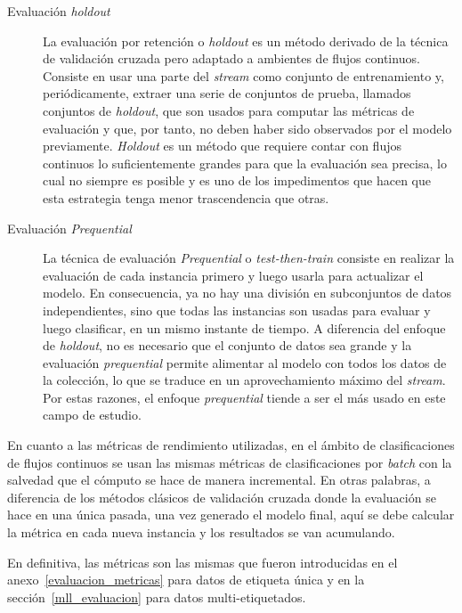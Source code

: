\begin{description}

	\item[Evaluación \textit{holdout}] La evaluación por retención o
	      \textit{holdout} es un método derivado de la técnica de validación cruzada
	      pero adaptado a ambientes de flujos continuos. Consiste en usar una parte
	      del \textit{stream} como conjunto de entrenamiento y, periódicamente,
	      extraer una serie de conjuntos de prueba, llamados conjuntos de
	      \textit{holdout}, que son usados para computar las métricas de evaluación
	      y que, por tanto, no deben haber sido observados por el modelo
	      previamente.  \textit{Holdout} es un método que requiere contar con flujos
	      continuos lo suficientemente grandes para que la evaluación sea precisa,
	      lo cual no siempre es posible y es uno de los impedimentos que hacen que
	      esta estrategia tenga menor trascendencia que otras.

	\item[Evaluación \textit{Prequential}] La técnica de evaluación
	      \textit{Prequential} o \textit{test-then-train} consiste en realizar la
	      evaluación de cada instancia primero y luego usarla para actualizar el
	      modelo. En consecuencia, ya no hay una división en subconjuntos de datos
	      independientes, sino que todas las instancias son usadas para evaluar y
	      luego clasificar, en un mismo instante de tiempo. A diferencia del enfoque
	      de \textit{holdout}, no es necesario que el conjunto de datos sea grande y
	      la evaluación \textit{prequential} permite alimentar al modelo con todos
	      los datos de la colección, lo que se traduce en un aprovechamiento máximo
	      del \textit{stream}. Por estas razones, el enfoque \textit{prequential}
	      tiende a ser el más usado en este campo de estudio.

\end{description}

En cuanto a las métricas de rendimiento utilizadas, en el ámbito de
clasificaciones de flujos continuos se usan las mismas métricas de
clasificaciones por \textit{batch} con la salvedad que el cómputo se hace de
manera incremental. En otras palabras, a diferencia de los métodos clásicos de
validación cruzada donde la evaluación se hace en una única pasada, una vez
generado el modelo final, aquí se debe calcular la métrica en cada nueva
instancia y los resultados se van acumulando.

En definitiva, las métricas son las mismas que fueron introducidas en el
anexo~\ref{evaluacion_metricas} para datos de etiqueta única y en la
sección~\ref{mll_evaluacion} para datos multi-etiquetados.

